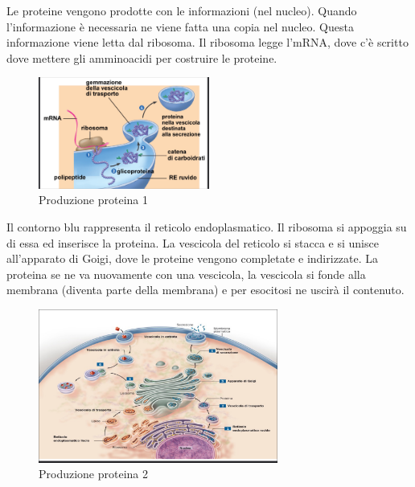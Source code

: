 \documentclass[a4paper]{article}
\begin{document}
Le proteine vengono prodotte con le informazioni (nel nucleo).
Quando l'informazione è necessaria ne viene fatta una copia nel nucleo.
Questa informazione viene letta dal ribosoma.
Il ribosoma legge l'mRNA,
dove c'è scritto dove mettere gli amminoacidi per costruire le proteine.

\setlength{\intextsep}{0pt}%
\begin{figure}
    \includegraphics[width=0.5\textwidth]{./prod_cellula2.png}
    \caption{Produzione proteina 1}
    \vspace{-1cm}
\end{figure}

Il contorno blu rappresenta il reticolo endoplasmatico.
Il ribosoma si appoggia su di essa ed inserisce la proteina.
La vescicola del reticolo si stacca e si unisce all'apparato di Goigi, dove le proteine
vengono completate e indirizzate.
La proteina se ne va nuovamente con una vescicola, la vescicola si fonde alla membrana (diventa parte della membrana)
e per esocitosi ne uscirà il contenuto.

\wrapfill

\setlength{\intextsep}{0pt}%
\begin{figure}
    \includegraphics[width=0.7\textwidth]{./prod_cellula.png}
    \caption{Produzione proteina 2}
    \vspace{-1cm}
\end{figure}
\end{document}
